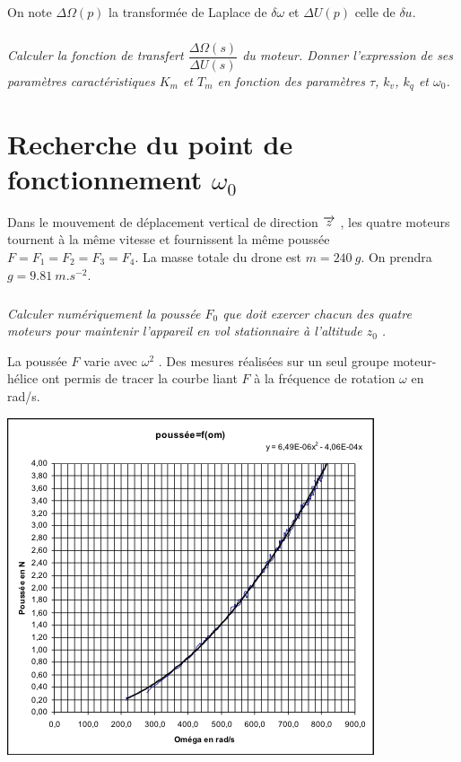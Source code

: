 \documentclass[10pt,fleqn]{article} %
\begin{document}
\begin{multicols}{2}
On note $\Delta \Omega (p)$ la transformée de Laplace de $\delta \omega$ et $\Delta U(p)$ celle de $\delta u$.


\subparagraph{}\textit{Calculer la fonction de transfert $\dfrac{\Delta{\Omega(s)}}{\Delta U(s)}$ du moteur. Donner l'expression de ses paramètres caractéristiques $K_m$ et $T_m$ en fonction des paramètres $\tau$, $k_v$, $k_q$ et $\omega_0$.}

\section*{Recherche du point de fonctionnement $\omega_0$}
Dans le mouvement de déplacement vertical de direction $\overrightarrow{z}$ , les quatre moteurs tournent à la même vitesse et fournissent la même poussée $F=F_1=F_2=F_3=F_4$.
La masse totale du drone est $m=\SI{240}{g}$. On prendra $g=\SI{9,81}{m.s^{-2}}$.

\subparagraph{}\textit{Calculer numériquement la poussée $F_0$ que doit exercer chacun des quatre moteurs pour maintenir l’appareil en vol stationnaire à l’altitude $z_0$ .}

La poussée $F$ varie avec $\omega^2$ . Des mesures réalisées sur un seul groupe moteur-hélice ont permis de tracer la courbe liant $F$ à la fréquence de rotation $\omega$ en rad/s.

\begin{center}
\includegraphics[width=\linewidth]{images/fig_04}
\end{center}


\end{multicols}
\end{document}

